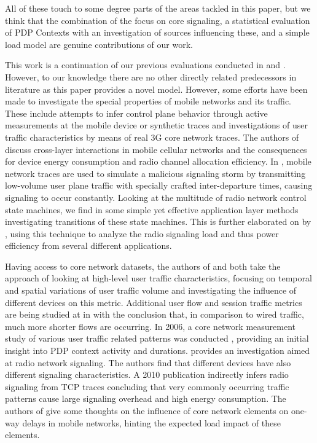 All of these touch to some degree parts of the areas tackled in this paper, but we think that the combination of the focus on core signaling, a statistical evaluation of PDP Contexts with an investigation of sources influencing these, and a simple load model are genuine contributions of our work.


This work is a continuation of our previous evaluations conducted in \cite{metzger2012research} and \cite{metzger2013}. However, to our knowledge there are no other directly related predecessors in literature as this paper provides a novel model. However, some efforts have been made to investigate the special properties of mobile networks and its traffic. These include attempts to infer control plane behavior through active measurements at the mobile device or synthetic traces and investigations of user traffic characteristics by means of real 3G core network traces.
The authors of \cite{qian2011profiling} discuss cross-layer interactions in mobile cellular networks and the consequences for device energy consumption and radio channel allocation efficiency. In \cite{lee2007detection}, mobile network traces are used to simulate a malicious signaling storm by transmitting low-volume user plane traffic with specially crafted inter-departure times, causing signaling to occur constantly. Looking at the multitude of radio network control state machines, we find in \cite{5360763} some simple yet effective application layer methods investigating transitions of these state machines. This is further elaborated on by \cite{schwartz2013angrybirds}, using this technique to analyze the radio signaling load and thus power efficiency from several different applications.

Having access to core network datasets, the authors of \cite{shafiq2011characterizing} and \cite{paul2011understanding} both take the approach of looking at high-level user traffic characteristics, focusing on temporal and spatial variations of user traffic volume and investigating the influence of different devices on this metric. Additional user flow and session traffic metrics are being studied at in \cite{Zhang:2012:UCC:2377677.2377764} with the conclusion that, in comparison to wired traffic, much more shorter flows are occurring. In 2006, a core network measurement study of various user traffic related patterns was conducted \cite{svoboda2006composition}, providing an initial insight into \gls{PDP} context activity and durations. \cite{he2012panoramic} provides an investigation aimed at radio network signaling. The authors find that different devices have also different signaling characteristics. A 2010 publication \cite{Qian:2010:CRR:1879141.1879159} indirectly infers radio signaling from TCP traces concluding that very commonly occurring traffic patterns cause large signaling overhead and high energy consumption. The authors of \cite{4675847} give some thoughts on the influence of core network elements on one-way delays in mobile networks, hinting the expected load impact of these elements.



